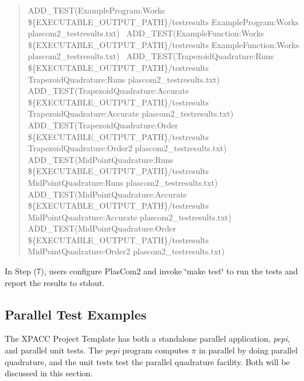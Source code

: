\begin{quote}
A\+D\+D\+\_\+\+T\+E\+ST(Example\+Program\+:Works \$\{E\+X\+E\+C\+U\+T\+A\+B\+L\+E\+\_\+\+O\+U\+T\+P\+U\+T\+\_\+\+P\+A\+TH\}/testresults Example\+Program\+:Works plascom2\+\_\+testresults.\+txt)~\newline
A\+D\+D\+\_\+\+T\+E\+ST(Example\+Function\+:Works \$\{E\+X\+E\+C\+U\+T\+A\+B\+L\+E\+\_\+\+O\+U\+T\+P\+U\+T\+\_\+\+P\+A\+TH\}/testresults Example\+Function\+:Works plascom2\+\_\+testresults.\+txt)~\newline
A\+D\+D\+\_\+\+T\+E\+ST(Trapezoid\+Quadrature\+:Runs \$\{E\+X\+E\+C\+U\+T\+A\+B\+L\+E\+\_\+\+O\+U\+T\+P\+U\+T\+\_\+\+P\+A\+TH\}/testresults Trapezoid\+Quadrature\+:Runs plascom2\+\_\+testresults.\+txt)~\newline
A\+D\+D\+\_\+\+T\+E\+ST(Trapezoid\+Quadrature\+:Accurate \$\{E\+X\+E\+C\+U\+T\+A\+B\+L\+E\+\_\+\+O\+U\+T\+P\+U\+T\+\_\+\+P\+A\+TH\}/testresults Trapezoid\+Quadrature\+:Accurate plascom2\+\_\+testresults.\+txt)~\newline
A\+D\+D\+\_\+\+T\+E\+ST(Trapezoid\+Quadrature\+:Order \$\{E\+X\+E\+C\+U\+T\+A\+B\+L\+E\+\_\+\+O\+U\+T\+P\+U\+T\+\_\+\+P\+A\+TH\}/testresults Trapezoid\+Quadrature\+:Order2 plascom2\+\_\+testresults.\+txt)~\newline
A\+D\+D\+\_\+\+T\+E\+ST(Mid\+Point\+Quadrature\+:Runs \$\{E\+X\+E\+C\+U\+T\+A\+B\+L\+E\+\_\+\+O\+U\+T\+P\+U\+T\+\_\+\+P\+A\+TH\}/testresults Mid\+Point\+Quadrature\+:Runs plascom2\+\_\+testresults.\+txt)~\newline
A\+D\+D\+\_\+\+T\+E\+ST(Mid\+Point\+Quadrature\+:Accurate \$\{E\+X\+E\+C\+U\+T\+A\+B\+L\+E\+\_\+\+O\+U\+T\+P\+U\+T\+\_\+\+P\+A\+TH\}/testresults Mid\+Point\+Quadrature\+:Accurate plascom2\+\_\+testresults.\+txt)~\newline
A\+D\+D\+\_\+\+T\+E\+ST(Mid\+Point\+Quadrature\+:Order \$\{E\+X\+E\+C\+U\+T\+A\+B\+L\+E\+\_\+\+O\+U\+T\+P\+U\+T\+\_\+\+P\+A\+TH\}/testresults Mid\+Point\+Quadrature\+:Order2 plascom2\+\_\+testresults.\+txt)~\newline
\end{quote}


In Step (7), users configure Plas\+Com2 and invoke \char`\"{}make test\char`\"{} to run the tests and report the results to stdout.\hypertarget{testingproject_guide_ixpt_parallel_tests}{}\subsection{Parallel Test Examples}\label{testingproject_guide_ixpt_parallel_tests}
The X\+P\+A\+CC Project Template has both a standalone parallel application, {\itshape pepi}, and parallel unit tests. The {\itshape pepi} program computes $\pi$ in parallel by doing parallel quadrature, and the unit tests test the parallel quadrature facility. Both will be discussed in this section.

